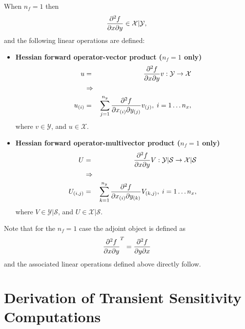 \documentclass[pdf,ps2pdf,11pt]{SANDreport}
\begin{document}
When $n_f=1$ then
%
\begin{equation}
\displaystyle{\frac{\partial^2 f}{\partial x \partial y}}\in\mathcal{X}|\mathcal{Y},
\end{equation}
%
and the following linear operations are defined:
%
\begin{itemize}
%
{}\item \textbf{Hessian forward operator-vector product ($n_f=1$ only)}
%
\begin{eqnarray*}
u & = & \displaystyle{\frac{\partial^2 f}{\partial x \partial y}} v : \mathcal{Y} \rightarrow \mathcal{X} \\
& \Rightarrow & \\
u_{(i)} & = & \sum_{j=1}^{n_y} \displaystyle{\frac{\partial^2 f}{\partial x_{(i)} \partial y_{(j)}}} v_{(j)}, \; i = 1 \ldots n_x,
\end{eqnarray*}
%
where $v\in\mathcal{Y}$, and $u\in\mathcal{X}$.
%
{}\item \textbf{Hessian forward operator-multivector product ($n_f=1$ only)}
%
\begin{eqnarray*}
U & = & \displaystyle{\frac{\partial^2 f}{\partial x \partial y}} V : \mathcal{Y}|\mathcal{S} \rightarrow \mathcal{X}|\mathcal{S} \\
& \Rightarrow & \\
U_{(i,j)} & = & \sum_{k=1}^{n_y} \displaystyle{\frac{\partial^2 f}{\partial x_{(i)} \partial y_{(k)}}} V_{(k,j)}, \; i = 1 \ldots n_x,
\end{eqnarray*}
%
where $V\in\mathcal{Y}|\mathcal{S}$, and $U\in\mathcal{X}|\mathcal{S}$.
%
\end{itemize}

Note that for the $n_f=1$ case the adjoint object is defined as
%
\begin{equation}
\displaystyle{\frac{\partial^2 f}{\partial x \partial y}}^T = \displaystyle{\frac{\partial^2 f}{\partial y \partial x}}
\end{equation}
%
and the associated linear operations defined above directly follow.

\section{Derivation of Transient Sensitivity Computations}
\label{rythmos:app:sens-derivations}
\end{document}
